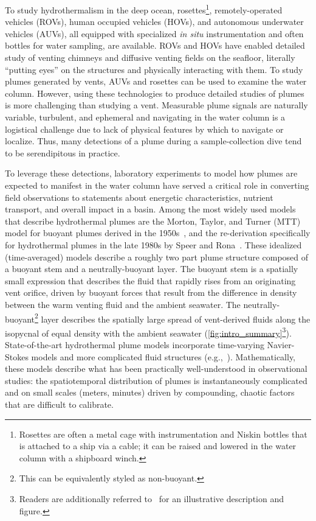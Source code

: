 To study hydrothermalism in the deep ocean, rosettes\footnote{Rosettes are often a metal cage with instrumentation and Niskin bottles that is attached to a ship via a cable; it can be raised and lowered in the water column with a shipboard winch.}, remotely-operated vehicles (ROVs), human occupied vehicles (HOVs), and autonomous underwater vehicles (AUVs), all equipped with specialized \emph{in situ} instrumentation and often bottles for water sampling, are available.
ROVs and HOVs have enabled detailed study of venting chimneys and diffusive venting fields on the seafloor, literally ``putting eyes'' on the structures and physically interacting with them.
To study plumes generated by vents, AUVs and rosettes can be used to examine the water column.
However, using these technologies to produce detailed studies of plumes is more challenging than studying a vent.
Measurable plume signals are naturally variable, turbulent, and ephemeral and navigating in the water column is a logistical challenge due to lack of physical features by which to navigate or localize. 
Thus, many detections of a plume during a sample-collection dive tend to be serendipitous in practice.

To leverage these detections, laboratory experiments to model how plumes are expected to manifest in the water column have served a critical role in converting field observations to statements about energetic characteristics, nutrient transport, and overall impact in a basin.
Among the most widely used models that describe hydrothermal plumes are the Morton, Taylor, and Turner (MTT) model for buoyant plumes derived in the 1950s~\autocite{morton1956turbulent}, and the re-derivation specifically for hydrothermal plumes in the late 1980s by Speer and Rona~\autocite{speer1989model}.
These idealized (time-averaged) models describe a roughly two part plume structure composed of a buoyant stem and a neutrally-buoyant layer. 
The buoyant stem is a spatially small expression that describes the fluid that rapidly rises from an originating vent orifice, driven by buoyant forces that result from the difference in density between the warm venting fluid and the ambient seawater.
The neutrally-buoyant\footnote{This can be equivalently styled as non-buoyant.} layer describes the spatially large spread of vent-derived fluids along the isopycnal of equal density with the ambient seawater (\cref{fig:intro_summary}\footnote{Readers are additionally referred to~\cite{yoerger2007autonomous} for an illustrative description and figure.}). 
State-of-the-art hydrothermal plume models incorporate time-varying Navier-Stokes models and more complicated fluid structures (e.g.,~\cite{lavelle2013turbulent,xu2012deep}).
Mathematically, these models describe what has been practically well-understood in observational studies: the spatiotemporal distribution of plumes is instantaneously complicated and on small scales (meters, minutes) driven by compounding, chaotic factors that are difficult to calibrate.



